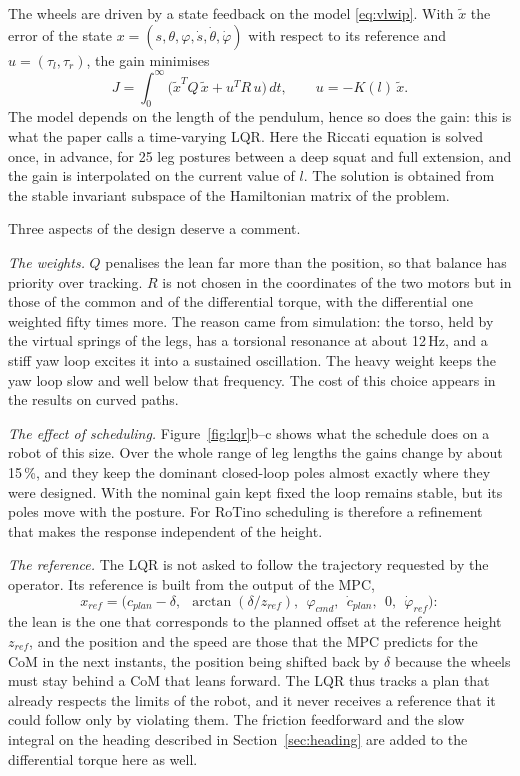 \documentclass[11pt,a4paper]{article}
\begin{document}
The wheels are driven by a state feedback on the model \eqref{eq:vlwip}. With $\tilde x$ the error of the state
$x=(s,\theta,\varphi,\dot s,\dot\theta,\dot\varphi)$ with respect to its reference and $u=(\tau_l,\tau_r)$, the gain
minimises
\begin{equation}
  J=\int_0^\infty\big(\tilde x^{T}Q\,\tilde x+u^{T}R\,u\big)\,dt,\qquad u=-K(l)\,\tilde x .
  \label{eq:lqr}
\end{equation}
The model depends on the length of the pendulum, hence so does the gain: this is what the paper calls a
time-varying LQR. Here the Riccati equation is solved once, in advance, for 25 leg postures
between a deep squat and full extension, and the gain is interpolated on the current value of $l$. The solution
is obtained from the stable invariant subspace of the Hamiltonian matrix of the problem.

Three aspects of the design deserve a comment.

\emph{The weights.} $Q$ penalises the lean far more than the position, so that balance has priority over
tracking. $R$ is not chosen in the coordinates of the two motors but in those of the common and of the
differential torque, with the differential one weighted fifty times more. The reason came from simulation: the
torso, held by the virtual springs of the legs, has a torsional resonance at about 12\,Hz, and a stiff yaw loop
excites it into a sustained oscillation. The heavy weight keeps the yaw loop slow and well below that frequency.
The cost of this choice appears in the results on curved paths.

\emph{The effect of scheduling.} Figure~\ref{fig:lqr}b--c shows what the schedule does on a robot of this size.
Over the whole range of leg lengths the gains change by about 15\,\%, and they keep the dominant closed-loop poles
almost exactly where they were designed. With the nominal gain kept fixed the loop remains stable, but its poles
move with the posture. For RoTino scheduling is therefore a refinement that makes the response independent of the
height.

\emph{The reference.} The LQR is not asked to follow the trajectory requested by the operator. Its reference is
built from the output of the MPC,
\begin{equation}
  x_{ref}=\big(c_{plan}-\delta,\ \ \arctan(\delta/z_{ref}),\ \ \varphi_{cmd},\ \ \dot c_{plan},\ \ 0,\ \ \dot\varphi_{ref}\big):
  \label{eq:xref}
\end{equation}
the lean is the one that corresponds to the planned offset at the reference height $z_{ref}$, and the position and
the speed are those that the MPC predicts for the CoM in the next instants, the position being shifted back by
$\delta$ because the wheels must stay behind a CoM that leans forward. The LQR thus tracks a plan that already
respects the limits of the robot, and it never receives a reference that it could follow only by violating them. The friction feedforward
and the slow integral on the heading described in Section~\ref{sec:heading} are added to the differential torque
here as well.
\end{document}
